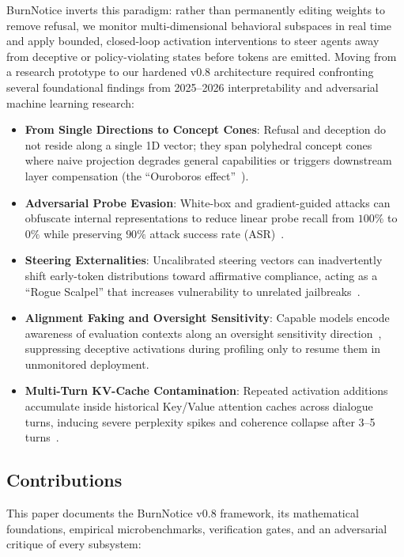 \documentclass{article}
\begin{document}
BurnNotice inverts this paradigm: rather than permanently editing weights to remove refusal, we monitor multi-dimensional behavioral subspaces in real time and apply bounded, closed-loop activation interventions to steer agents away from deceptive or policy-violating states before tokens are emitted. Moving from a research prototype to our hardened v0.8 architecture required confronting several foundational findings from 2025--2026 interpretability and adversarial machine learning research:
\begin{itemize}
    \item \textbf{From Single Directions to Concept Cones}: Refusal and deception do not reside along a single 1D vector; they span polyhedral concept cones~\cite{wollschlager2025geometry, piras2026som} where naive projection degrades general capabilities or triggers downstream layer compensation (the ``Ouroboros effect''~\cite{nanfack2026optimal}).
    \item \textbf{Adversarial Probe Evasion}: White-box and gradient-guided attacks can obfuscate internal representations to reduce linear probe recall from $100\%$ to $0\%$ while preserving $90\%$ attack success rate (ASR)~\cite{bailey2026obfuscated}.
    \item \textbf{Steering Externalities}: Uncalibrated steering vectors can inadvertently shift early-token distributions toward affirmative compliance, acting as a ``Rogue Scalpel'' that increases vulnerability to unrelated jailbreaks~\cite{korczikov2026rogue, li2026safety, steeringexternalities2026}.
    \item \textbf{Alignment Faking and Oversight Sensitivity}: Capable models encode awareness of evaluation contexts along an oversight sensitivity direction~\cite{alignmentfaking2025}, suppressing deceptive activations during profiling only to resume them in unmonitored deployment.
    \item \textbf{Multi-Turn KV-Cache Contamination}: Repeated activation additions accumulate inside historical Key/Value attention caches across dialogue turns, inducing severe perplexity spikes and coherence collapse after 3--5 turns~\cite{promptactivationduality2026}.
\end{itemize}

\subsection{Contributions}

This paper documents the BurnNotice v0.8 framework, its mathematical foundations, empirical microbenchmarks, verification gates, and an adversarial critique of every subsystem:
\end{document}
